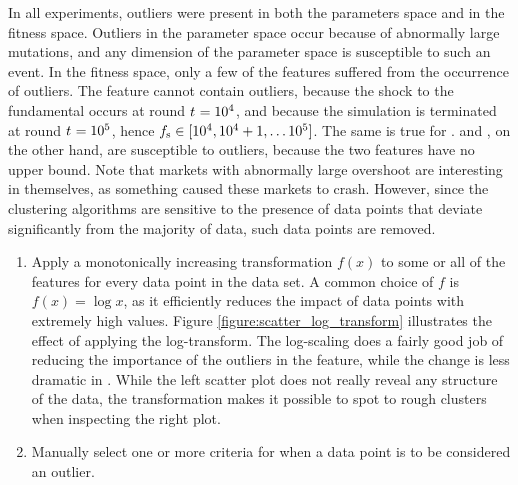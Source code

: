 In all experiments, outliers were present in both the parameters space and in the fitness space. Outliers in the parameter space occur because of abnormally large mutations, and any dimension of the parameter space is susceptible to such an event. In the fitness space, only a few of the features suffered from the occurrence of outliers. The feature \roundstable cannot contain outliers, because the shock to the fundamental occurs at round $t_{} = 10^4$, and because the simulation is terminated at round $t_{} = 10^5$, hence $f_\text{s} \in [10^4,10^4+1,\hdots 10^5]$. The same is true for \timetoreachnewfundamental. \stdev and \overshoot, on the other hand, are susceptible to outliers, because the two features have no upper bound. Note that markets with abnormally large overshoot are interesting in themselves, as something caused these markets to crash. However, since the clustering algorithms are sensitive to the presence of data points that deviate significantly from the majority of data, such data points are removed. 

\begin{enumerate}
\item Apply a monotonically increasing transformation $f(x)$ to some or all of the features for every data point in the data set. A common choice of $f$ is $f(x) = \log x$, as it efficiently reduces the impact of data points with extremely high values. Figure \ref{figure:scatter_log_transform} illustrates the effect of applying the log-transform. The log-scaling does a fairly good job of reducing the importance of the outliers in the \stdev feature, while the change is less dramatic in \timetoreachnewfundamental. While the left scatter plot does not really reveal any structure of the data, the transformation makes it possible to spot to rough clusters when inspecting the right plot.
\item Manually select one or more criteria for when a data point is to be considered an outlier. 
\end{enumerate}




